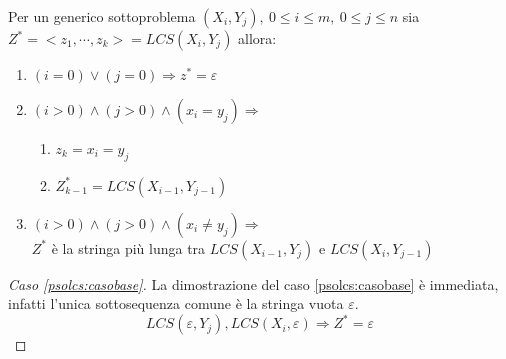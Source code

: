 \begin{lemma}
    Per un generico sottoproblema $\left( X_i, Y_j \right), \: 0 \leq i \leq m, \: 0 \leq j \leq n$ sia 
    $ Z^* = < z_1, \cdots, z_k > = LCS\left( X_i,Y_j \right)$ allora:
    \begin{enumerate}
        \item $(i=0) \vee (j=0) \Rightarrow z^* = \varepsilon$
            \label{psolcs:casobase}
        \item $(i>0) \wedge (j>0) \wedge (x_i = y_j) \Rightarrow $
            \begin{enumerate}
                \item $z_k = x_i = y_j$
                    \label{psolcs:caso2a}
                \item $Z_{k-1}^* = LCS(X_{i-1}, Y_{j-1})$
                    \label{psolcs:caso2b}
            \end{enumerate}
        \item $(i>0) \wedge (j>0) \wedge (x_i \neq y_j) \Rightarrow $
            \\
            $ Z^*$ è la stringa più lunga tra $LCS\left( X_{i-1}, Y_j \right)$ e $LCS\left( X_i, Y_{j-1} \right)$
            \label{psolcs:caso3}
    \end{enumerate}
    \label{lemma:psolcs}
\end{lemma}

\begin{proof}[Caso \ref{psolcs:casobase}]
    La dimostrazione del caso \ref{psolcs:casobase} è immediata, infatti l'unica sottosequenza comune è la stringa vuota $\varepsilon$.
    \[
        LCS(\varepsilon, Y_j), LCS(X_i, \varepsilon) \Rightarrow Z^*=\varepsilon 
    \]
\end{proof}

